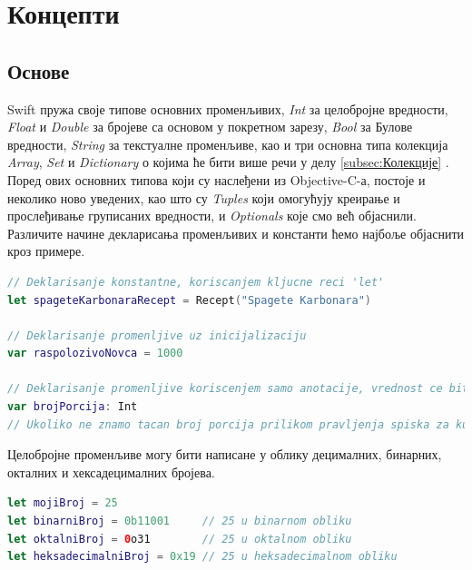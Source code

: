 \documentclass[12pt,oneside]{memoir}
\begin{document}
\section{Концепти}
\label{sec:Концепти}

\subsection{Основе}

\indent Swift пружа своје типове основних променљивих, \textit{Int} за целобројне вредности, \textit{Float} и \textit{Double} за бројеве са основом у покретном зарезу, \textit{Bool} за Булове вредности, \textit{String} за текстуалне променљиве, као и три основна типа колекција \textit{Array}, \textit{Set} и \textit{Dictionary} о којима ће бити више речи у делу \ref{subsec:Колекције} . 
\\ 
\indent Поред ових основних типова који су наслеђени из Objective-C-а, постоје и неколико ново уведених, као што су \textit{Tuples} који омогућују креирање и прослеђивање груписаних вредности, и \textit{Optionals} које смо већ објаснили. 
\\
\indent Различите начине декларисања променљивих и константи ћемо најбоље објаснити кроз примере.

\begin{lstlisting}[caption=\textit{{Декларисања променљивих и константи}}, label={lst:Декларисања променљивих и константи}, language=Swift, frame=single]
// Deklarisanje konstantne, koriscanjem kljucne reci 'let'
let spageteKarbonaraRecept = Recept("Spagete Karbonara")

// Deklarisanje promenljive uz inicijalizaciju
var raspolozivoNovca = 1000

// Deklarisanje promenljive koriscenjem samo anotacije, vrednost ce biti dodeljena kasnije
var brojPorcija: Int
// Ukoliko ne znamo tacan broj porcija prilikom pravljenja spiska za kupovinu, taj broj mozemo dodati kasnije
\end{lstlisting}

\indent Целобројне променљиве могу бити написане у облику децималних, бинарних, окталних и хексадецималних бројева. 

\begin{lstlisting}[caption=\textit{{Целобројне променљиве}}, label={lst:Целобројне променљиве}, language=Swift, frame=single]
let mojiBroj = 25 
let binarniBroj = 0b11001     // 25 u binarnom obliku
let oktalniBroj = 0o31        // 25 u oktalnom obliku
let heksadecimalniBroj = 0x19 // 25 u heksadecimalnom obliku
\end{lstlisting}
\end{document}
